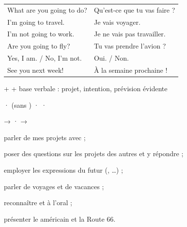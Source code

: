 \begin{essentiel}
\begin{minipage}[t]{0.54\linewidth}
\renewcommand{\arraystretch}{1.32}
\begin{tabular}{@{}>{\enOn\otSemi\fontsize{9.4}{11}\selectfont}l<{\enOff}@{\hspace{3mm}}>{\fontsize{9.2}{11}\selectfont\color{white!78!otNavy}}l@{}}
What are you going to do?    & Qu'est-ce que tu vas faire ?\\
I'm going to travel.         & Je vais voyager.\\
I'm not going to work.       & Je ne vais pas travailler.\\
Are you going to fly?        & Tu vas prendre l'avion ?\\
Yes, I am. / No, I'm not.    & Oui. / Non.\\
See you next week!           & À la semaine prochaine !\\
\end{tabular}
\end{minipage}\hfill
\begin{minipage}[t]{0.41\linewidth}
{\fontsize{9.2}{11.6}\selectfont {} +  + base verbale : projet, intention,
prévision évidente\par}
{\fontsize{9.2}{11.6}\selectfont {} ·  (sans ) ·  ·
\par}
{\fontsize{9.2}{11.6}\selectfont {} →  ·  → \par}
\end{minipage}
\end{essentiel}

\begin{jesais}
\item parler de mes projets avec  ;
\item poser des questions sur les projets des autres et y répondre ;
\item employer les expressions du futur (, …) ;
\item parler de voyages et de vacances ;
\item reconnaître  et  à l'oral ;
\item présenter le  américain et la Route 66.
\end{jesais}

